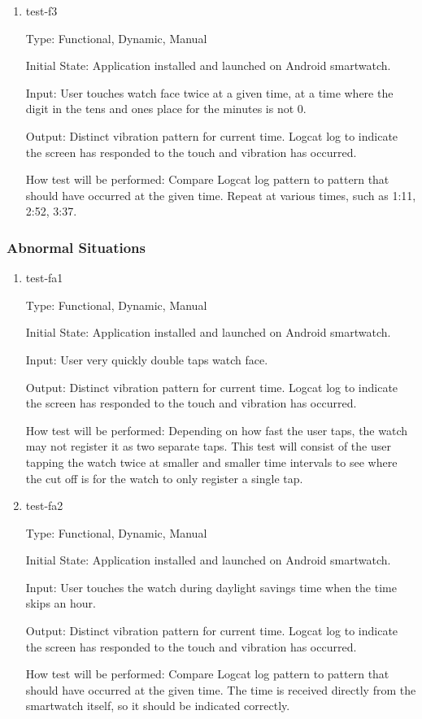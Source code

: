 \begin{enumerate}
\item{test-f3\\}

Type: Functional, Dynamic, Manual
					
Initial State: Application installed and launched on Android smartwatch. 
					
Input: User touches watch face twice at a given time, at a time where the digit in the tens and ones place for the minutes is not 0.
					
Output: Distinct vibration pattern for current time. Logcat log to indicate the screen has responded to the touch and vibration has occurred.  
					
How test will be performed: Compare Logcat log pattern to pattern that should have occurred at the given time. Repeat at various times, such as 1:11, 2:52, 3:37. 

\end{enumerate}


\subsubsection{Abnormal Situations}

\begin{enumerate}

\item{test-fa1\\}

Type: Functional, Dynamic, Manual
					
Initial State: Application installed and launched on Android smartwatch. 
					
Input: User very quickly double taps watch face.
					
Output: Distinct vibration pattern for current time. Logcat log to indicate the screen has responded to the touch and vibration has occurred.
					
How test will be performed: Depending on how fast the user taps, the watch may not register it as two separate taps. This test will consist of the user tapping the watch twice at smaller and smaller time intervals to see where the cut off is for the watch to only register a single tap.
					
\item{test-fa2\\}

Type: Functional, Dynamic, Manual
					
Initial State: Application installed and launched on Android smartwatch. 
					
Input: User touches the watch during daylight savings time when the time skips an hour.
					
Output: Distinct vibration pattern for current time. Logcat log to indicate the screen has responded to the touch and vibration has occurred.
					
How test will be performed: Compare Logcat log pattern to pattern that should have occurred at the given time. The time is received directly from the smartwatch itself, so it should be indicated correctly.


\end{enumerate}

